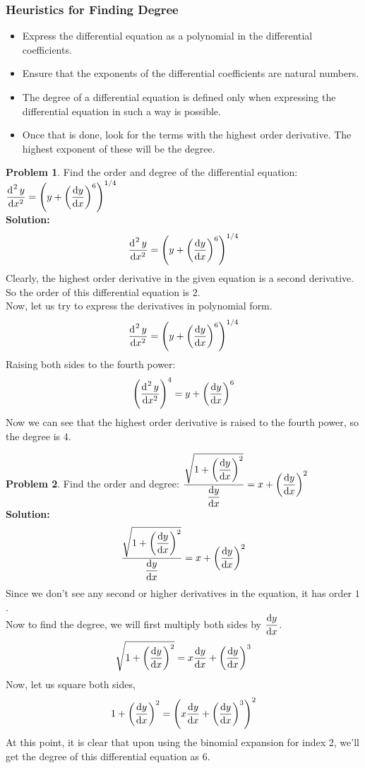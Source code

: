 \documentclass[14]{article}
\theoremstyle{definition}
\newtheorem{prob}{Problem}
\theoremstyle{case}
\begin{document}
\subsubsection{Heuristics for Finding Degree}
\begin{itemize}
\item Express the differential equation as a polynomial in the differential coefficients.
\item Ensure that the exponents of the differential coefficients are natural numbers.
\item The degree of a differential equation is defined only when expressing the differential equation in such a way is possible.
\item Once that is done, look for the terms with the highest order derivative. The highest exponent of these will be the degree.
\end{itemize}
\pagebreak
\begin{prob}
Find the order and degree of the differential equation:
$\dfrac{\dif^{\;2}y}{\dif x^2} = \left( y + \left( \dfrac{\dif y}{\dif x} \right)^6 \right)^{1/4}$\\
\textbf{Solution:}
\[\dfrac{\dif^{\;2}y}{\dif x^2} = \left( y + \left( \dfrac{\dif y}{\dif x} \right)^6 \right)^{1/4}\]
Clearly, the highest order derivative in the given equation is a second derivative. So the order of this differential equation is $2$.\\
Now, let us try to express the derivatives in polynomial form.
\[\dfrac{\dif^{\;2}y}{\dif x^2} = \left( y + \left( \dfrac{\dif y}{\dif x} \right)^6 \right)^{1/4}\]
Raising both sides to the fourth power:
\[\left(\dfrac{\dif^{\;2}y}{\dif x^2}\right)^4 =  y + \left( \dfrac{\dif y}{\dif x} \right)^6 \]
Now we can see that the highest order derivative is raised to the fourth power, so the degree is $4$.
\end{prob}
\begin{prob}
Find the order and degree:
$\dfrac{\sqrt{1 + \left( \dfrac{\dif y}{\dif x} \right)^2}}{\dfrac{\dif y}{\dif x}} = x + \left( \dfrac{\dif y}{\dif x} \right)^2$\\
\textbf{Solution:}
\[\dfrac{\sqrt{1 + \left( \dfrac{\dif y}{\dif x} \right)^2}}{\dfrac{\dif y}{\dif x}} = x + \left( \dfrac{\dif y}{\dif x} \right)^2\]
Since we don't see any second or higher derivatives in the equation, it has order $1$.\\
Now to find the degree, we will first multiply both sides by $\dfrac{\dif y}{\dif x}$.
\[\sqrt{1 + \left( \dfrac{\dif y}{\dif x} \right)^2} = x \dfrac{\dif y}{\dif x} + \left( \dfrac{\dif y}{\dif x} \right)^3\]
Now, let us square both sides,
\[1 + \left(\dfrac{\dif y}{\dif x}\right)^2 = \left( x \dfrac{\dif y}{\dif x} + \left( \dfrac{\dif y}{\dif x} \right)^3\right)^2\]
At this point, it is clear that upon using the binomial expansion for index 2, we'll get the degree of this differential equation as $6$.
\end{prob}
\end{document}
